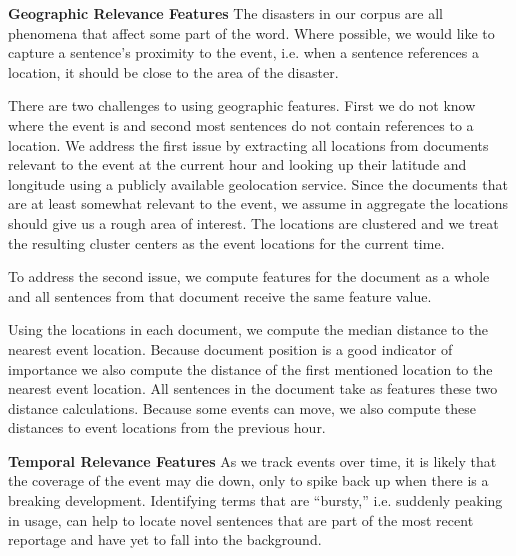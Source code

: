 \textbf{Geographic Relevance Features}
The disasters in our corpus are all phenomena that
affect some part of the word. 
Where possible, we would like to capture a sentence's proximity to the event,
i.e. when a sentence references a location, it should be close to the 
area of the disaster. 

There are two challenges to using geographic features. First we do not 
know where the event is and second most sentences do not contain references
to a location.
We address the first issue by extracting all locations from 
documents relevant to the event at the
current hour and looking up their latitude and 
longitude using a publicly available geolocation service. 
Since the documents that are at least somewhat relevant to the event,
we assume in aggregate the locations should give us a rough area of interest.
The locations are clustered %
and we treat the resulting cluster centers
as the event locations for the current time.


To address the second issue, 
we compute features for the document as a whole and all
sentences from that document receive the same feature value.

Using the locations in each document, we compute the median distance to the 
nearest event location. Because document position is a good indicator 
of importance we also compute the distance of the first mentioned
location to the nearest event location. All sentences in the document take
as features these two distance calculations.
Because some events can move, we also
compute these distances to event locations from the previous hour.



\textbf{Temporal Relevance Features}
As we track events over time, it is likely that the coverage of the event 
may die down, only to spike back up when there is a breaking development.
Identifying terms that are ``bursty,'' i.e. suddenly peaking in usage,
can help to locate novel sentences that are part of the most recent reportage
and have yet to fall into the background.

